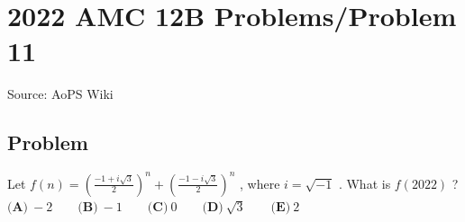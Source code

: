 \documentclass[12pt]{article}
\begin{document}
\section*{{2022 AMC 12B Problems/Problem 11}}
Source: AoPS Wiki

\subsection*{Problem}
Let $f(n) = \left( \frac{-1+i\sqrt{3}}{2} \right)^n + \left( \frac{-1-i\sqrt{3}}{2} \right)^n$ , where $i = \sqrt{-1}$ . What is $f(2022)$ ? $\textbf{(A)}\ -2 \qquad \textbf{(B)}\ -1 \qquad \textbf{(C)}\ 0 \qquad \textbf{(D)}\ \sqrt{3} \qquad \textbf{(E)}\ 2$
\end{document}
